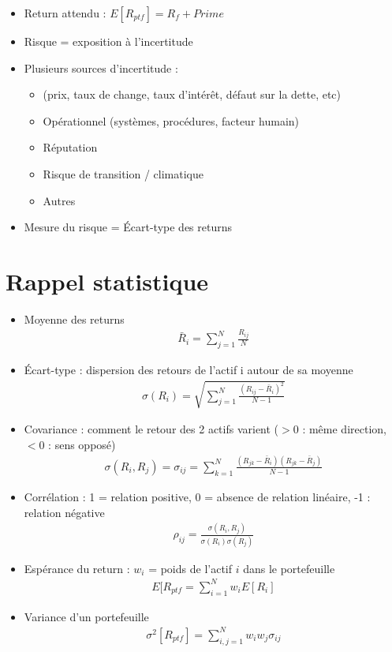 \begin{itemize}
    \item Return attendu : $E[R_{ptf}] = R_f + Prime$
    \item Risque = exposition à l'incertitude
    \item Plusieurs sources d'incertitude :
    \begin{itemize}
        \item {} (prix, taux de change, taux d'intérêt, défaut sur la dette, etc)
        \item Opérationnel (systèmes, procédures, facteur humain)
        \item Réputation
        \item Risque de transition / climatique
        \item Autres
    \end{itemize}
    \item Mesure du risque = Écart-type des returns
\end{itemize}

\section{Rappel statistique}

\begin{itemize}
    \item Moyenne des returns
    \begin{align*}
        \bar{R}_i = \sum_{j=1}^N \frac{R_{ij}}{N}
    \end{align*}
    \item Écart-type : dispersion des retours de l'actif i autour de sa moyenne
    \begin{align*}
        \sigma (R_i) = \sqrt{\sum_{j=1}^N \frac{(R_{ij} - \bar{R}_i)^2}{N - 1}}
    \end{align*}
    \item Covariance : comment le retour des 2 actifs varient ($> 0$ : même direction, $< 0$ : sens opposé)
    \begin{align*}
        \sigma (R_i, R_j) = \sigma_{ij} = \sum_{k=1}^N \frac{(R_{jk} - \bar{R}_i)(R_{jk} - \bar{R}_j)}{N - 1}
    \end{align*}
    \item Corrélation : 1 = relation positive, 0 = absence de relation linéaire, -1 : relation négative
    \begin{align*}
        \rho_{ij} = \frac{\sigma(R_i, R_j)}{\sigma(R_i)\sigma(R_j)}
    \end{align*}
    \item Espérance du return : $w_i$ = poids de l'actif $i$ dans le portefeuille
    \begin{align*}
        E[R_{ptf} = \sum_{i=1}^N w_i E[R_i]
    \end{align*}
    \item Variance d'un portefeuille
    \begin{align*}
        \sigma^2[R_{ptf}] = \sum_{i, j=1}^N w_i w_j \sigma_{ij}
    \end{align*}
\end{itemize}

